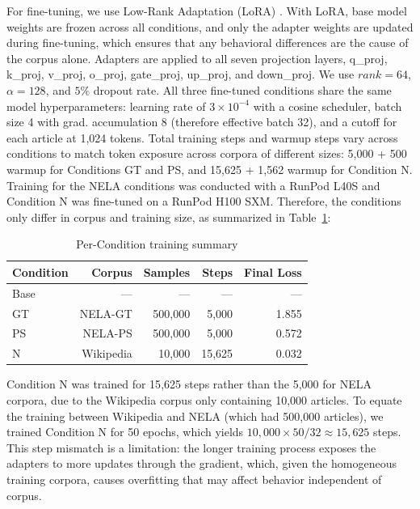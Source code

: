 \documentclass{article}
\begin{document}
For fine-tuning, we use Low-Rank Adaptation (LoRA) \cite{hu2021lora}. 
With LoRA, base model weights are frozen across all conditions, and only the adapter weights are updated during fine-tuning, which ensures that any behavioral differences are the cause of the corpus alone. 
Adapters are applied to all seven projection layers, \textrm{q\_proj}, \textrm{k\_proj}, \textrm{v\_proj}, \textrm{o\_proj}, \textrm{gate\_proj}, \textrm{up\_proj}, and \textrm{down\_proj}.
We use $rank = 64$, $\alpha = 128$, and $5\%$ dropout rate. 
All three fine-tuned conditions share the same model hyperparameters: learning rate of $3 \times 10^{-4}$ with a cosine scheduler, batch size 4 with grad. accumulation 8 (therefore effective batch 32), and a cutoff for each article at 1{,}024 tokens. 
Total training steps and warmup steps vary across conditions to match token exposure across corpora of different sizes: 5{,}000 + 500 warmup for Conditions GT and PS, and 15{,}625 + 1{,}562 warmup for Condition N.
Training for the NELA conditions was conducted with a RunPod L40S and Condition N was fine-tuned on a RunPod H100 SXM. 
Therefore, the conditions only differ in corpus and training size, as summarized in Table~\ref{tab:training_conditions}:

\begin{table}[htbp]
  \centering
  \caption{Per-Condition training summary}
  \label{tab:training_conditions}
  \begin{tabular}{lrrrr}
    \toprule
    Condition & Corpus & Samples & Steps & Final Loss \\
    \midrule
    Base  & ---    & ---     & ---    & --- \\
    GT    & NELA-GT   & 500{,}000 & 5{,}000  & 1.855 \\
    PS    & NELA-PS   & 500{,}000 & 5{,}000  & 0.572 \\
    N     & Wikipedia & 10{,}000  & 15{,}625 & 0.032 \\
    \bottomrule
  \end{tabular}
\end{table}

Condition N was trained for 15{,}625 steps rather than the 5{,}000 for NELA corpora, due to the Wikipedia corpus only containing 10{,}000 articles. 
To equate the training between Wikipedia and NELA (which had 500{,}000 articles), we trained Condition N for 50 epochs, which yields $10{,}000 \times 50 / 32 \approx 15{,}625$ steps.
This step mismatch is a limitation: the longer training process exposes the adapters to more updates through the gradient, which, given the homogeneous training corpora, causes overfitting that may affect behavior independent of corpus.  
\end{document}
